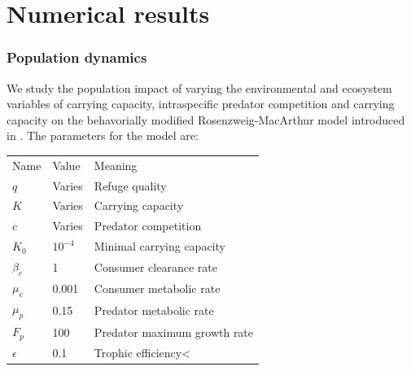 \section*{Numerical results}

\subsubsection*{Population dynamics}
We study the population impact of varying the environmental and ecosystem variables of carrying capacity, intraspecific predator competition and carrying capacity on the behavorially modified Rosenzweig-MacArthur model introduced in .
The parameters for the model are: \\
\begin{tabular}{l l l}
  Name & Value & Meaning \\
  $q$ & Varies & Refuge quality \\
  $K$ & Varies & Carrying capacity \\
  $c$ & Varies & Predator competition \\
  $K_0$ & $10^{-4}$ & Minimal carrying capacity \\
  $\beta_c$ & 1 & Consumer clearance rate \\
  $\mu_c$ & 0.001 & Consumer metabolic rate \\
  $\mu_p$ & 0.15 & Predator metabolic rate \\
  $F_p$ & 100 & Predator maximum growth rate \\
  $\epsilon$ & 0.1 & Trophic efficiency<
\end{tabular}

